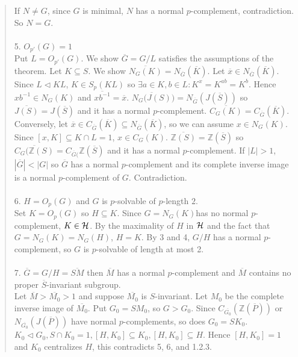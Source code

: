 \begin{quote}
If $N \neq G$, since $G$ is minimal,
$N$ has a normal $p$-complement, contradiction.  So $N = G$.
\\
\\
5. $O_{p'}(G) = 1$
\\
Put $L = O_{p'}(G)$.  We show ${\overline G} = G/L$ satisfies the assumptions of the theorem.
Let $K \subseteq S$.  We show ${\overline {N_G(K)}} = N_{\overline G}({\overline K})$.  Let
${\overline x} \in N_{\overline G}({\overline K})$.  Since $L \lhd KL$, $K \in S_p(KL)$ so
$\exists a \in K, b \in L: K^x = K^{ab}= K^b$.
Hence $xb^{-1} \in N_G(K)$ and ${\overline {xb^{-1}}}= {\overline x}$.
${\overline {N_G(J(S)})} = N_{\overline G}(J({\overline S}))$ so ${\overline {J(S)}} = J({\overline S})$
and it has a normal $p$-complement.
${\overline {C_G(K)}} = C_{\overline G}({\overline K})$.  Conversely, let
${\overline x} \in C_{\overline G}({\overline K}) \subseteq N_{\overline G}({\overline K})$,
so we can assume $x \in N_G(K)$. Since $[x, K] \subseteq  K \cap L = 1$, $x \in C_G(K)$.
${\overline {{\mathbb Z}(S)}} = {\mathbb Z}({\overline S})$ so
${\overline {C_G({\mathbb Z}(S)}} = C_{\overline G(}{\mathbb Z}({\overline S})$
and it has a normal $p$-complement.
If $|L| > 1$, $|{\overline G}| < |G|$ so ${\overline G}$ has a normal $p$-complement
and its complete inverse image is a normal $p$-complement of $G$.  Contradiction.
\\
\\
6. $H = O_p(G)$ and $G$ is $p$-solvable of $p$-length $2$.
\\
Set $K = O_p(G)$ so $H \subseteq K$.  Since $G = N_G(K)$has no normal $p$-complement,
$K \in {\cal H}$.  By the
maximality of $H$ in ${\cal H}$ and the fact that $G=N_G(K)= N_G(H)$, $H=K$.
By 3 and 4, $G/H$ has a normal $p$-complement, so $G$ is $p$-solvable of length at most 2.
\\
\\
7.  ${\overline G} = G/H = {\overline {SM}}$ then ${\overline M}$ has a normal $p$-complement and
${\overline M}$ contains no proper ${\overline S}$-invariant subgroup.
\\
Let ${\overline M} > {\overline {M_0}} > 1$ and suppose ${\overline {M_0}}$ is
$S$-invariant.  Let $M_0$ be the complete inverse image of ${\overline {M_0}}$.  Put $G_0 = S M_0$,
so $G > G_0$.
Since
$C_{\overline {G_0}}({\mathbb Z}({\overline P}))$ or $N_{\overline {G_0}}(J({\overline P}))$ have normal $p$-complements,
so does $G_0 = S K_0$.  $K_0 \lhd G_0, S \cap K_0 = 1, [H, K_0] \subseteq K_0, [H, K_0] \subseteq H$.  Hence
$[H, K_0] = 1$ and $K_0$ centralizes $H$, this contradicts 5, 6, and 1.2.3.

\end{quote}
